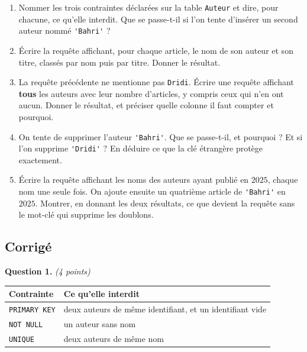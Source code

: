 \begin{enumerate}
  \item Nommer les trois contraintes déclarées sur la table
    \lstinline{Auteur} et dire, pour chacune, ce qu'elle interdit. Que se
    passe-t-il si l'on tente d'insérer un second auteur nommé
    \lstinline{'Bahri'} ?

  \item Écrire la requête affichant, pour chaque article, le nom de son auteur
    et son titre, classés par nom puis par titre. Donner le résultat.

  \item La requête précédente ne mentionne pas \lstinline{Dridi}. Écrire une
    requête affichant \textbf{tous} les auteurs avec leur nombre d'articles, y
    compris ceux qui n'en ont aucun. Donner le résultat, et préciser quelle
    colonne il faut compter et pourquoi.

  \item On tente de supprimer l'auteur \lstinline{'Bahri'}. Que se passe-t-il, et
    pourquoi ? Et si l'on supprime \lstinline{'Dridi'} ? En déduire ce que la
    clé étrangère protège exactement.

  \item Écrire la requête affichant les noms des auteurs ayant publié en
    $2025$, chaque nom une seule fois. On ajoute ensuite un quatrième article de
    \lstinline{'Bahri'} en $2025$. Montrer, en donnant les deux résultats, ce
    que devient la requête sans le mot-clé qui supprime les doublons.
\end{enumerate}

\subsection*{Corrigé}

\textbf{Question 1.} \emph{(4 points)}

\begin{center}
\begin{tabular}{|l|l|}
\hline
\textbf{Contrainte} & \textbf{Ce qu'elle interdit} \\
\hline
\texttt{PRIMARY KEY} & deux auteurs de même identifiant, et un identifiant vide \\
\hline
\texttt{NOT NULL} & un auteur sans nom \\
\hline
\texttt{UNIQUE} & deux auteurs de même nom \\
\hline
\end{tabular}
\end{center}

